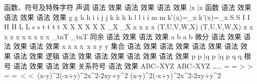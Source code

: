 函数、符号及特殊字符
声调
语法	效果	语法	效果	语法	效果
\bar{x}	\bar{x}	\acute{\eta}	\acute{\eta}	\check{\alpha}	\check{\alpha}
\grave{\eta}	\grave{\eta}	\breve{a}		\ddot{y}	
		\hat{\alpha}	\hat{\alpha}	\tilde{\iota}	\tilde{\iota}
函数
语法	效果	语法	效果	语法	效果
\sin\theta	\sin\!\theta	\cos\theta	\cos\!\theta	\tan\theta	\tan\!\theta
\arcsin{}	\arcsin{}	\arccos{}	\arccos{}	\arctan{}	\arctan\frac{L}{T}
\sinh g	\sinh\!g	\cosh h	\cosh\!h	\tanh i	\tanh\!i
j	j	k	k	h	h
l	l	i	i	m	m
k'(x)=\lim_{\Delta x}	k'(x)=\lim_{\Delta x}\!	\limsup S	\limsup S	\liminf I	\liminf I
\max H	\max\!H	\min L	\min\!L	\inf s	\inf s
\sup t	\sup t	\exp\!t	\exp\!t	\ln X	\ln\!X
\lg X	\lg\!X	\log X	\log\!X	\log_\alpha X	\log_\alpha\!X
\ker x	\ker x	\deg x	\deg\!x	\gcd(T,U,V,W,X)	\!\gcd(T,U,V,W,X)
\Pr x	\Pr x	\det x	\det\!x	\hom x	\hom x
\arg x	\arg x	\dim x	\dim x	\lim_{t\to n}T	\lim_{t\to n}T
同余
语法	效果	语法	效果
		a \bmod b	a \bmod b
微分
语法	效果	语法	效果	语法	效果
\nabla	\nabla	\partial x	\partial x	x	x\ 
\dot x	\dot x	\ddot y	\ddot y	 	 
集合
语法	效果	语法	效果	语法	效果	语法	效果	语法	效果
\forall	\forall	\exists	\exists	\empty	\empty	\emptyset	\emptyset	\varnothing	\varnothing
\in	\in	\ni	\ni	\not\in	\not\in	\notin	\notin	\subset	\subset
\subseteq	\subseteq	\supset	\supset	\supseteq	\supseteq	\cap	\cap	\bigcap	\bigcap
\cup	\cup	\bigcup	\bigcup	\biguplus	\biguplus	\sqsubset	\sqsubset	\sqsubseteq	\sqsubseteq
\sqsupset	\sqsupset	\sqsupseteq	\sqsupseteq	\sqcap	\sqcap	\sqcup	\sqcup	\bigsqcup	\bigsqcup
逻辑
语法	效果	语法	效果	语法	效果	语法	效果
p	p	\land	\land	\wedge	\wedge	\bigwedge	\bigwedge
\bar{q} \to p	\pagecolor{White} \bar{q} \to p	\lor	\lor	\vee	\vee	\bigvee	\bigvee
\lnot	\lnot	\neg q	\pagecolor{White} \neg q	\setminus	\setminus	\smallsetminus	\pagecolor{White} \smallsetminus
根号
语法	效果	语法	效果
			\pagecolor{White}
关系符号
语法	效果
\Delta ABC\sim\Delta XYZ	\Delta ABC\sim\Delta XYZ\!
\ldots	\sqrt{3}\ldots
\simeq	\simeq
\cong	\cong
\dot=	\dot=
\ggg	\ggg
\gg	\gg
>	>\,
\ge	\ge
\geqq	\geqq
=	=\,
\leq	\leq
\leqq	\leqq
<	<\,
\ll	\ll
\lll	\lll
(x-y)^2\equiv(-x+y)^2\equiv x^2-2xy+y^2	(x-y)^2\equiv(-x+y)^2\equiv x^2-2xy+y^2
